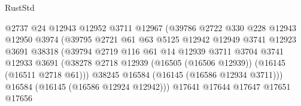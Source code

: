 \begin{lexlean}{RustStd}
\begin{coremodule}
                                        @2737
                                        @24
                                        @12943
                                        @12952
                                        @3711
                                        @12967
                                        (@39786
                                          @2722
                                          @330
                                          @228
                                          @12943
                                          @12950
                                          @3974
                                          (@39795
                                            @2721
                                            @61
                                            @63
                                            @5125
                                            @12942
                                            @12949
                                            @3741
                                            @12923
                                            @3691
                                            @38318
                                            (@39794
                                              @2719
                                              @116
                                              @61
                                              @14
                                              @12939
                                              @3711
                                              @3704
                                              @3741
                                              @12933
                                              @3691
                                              (@38278
                                                @2718
                                                @12939
                                                (@16505 (@16506 @12939))
                                                (@16145 (@16511 @2718 @61)))
                                              @38245
                                              @16584
                                              (@16145 (@16586 @12934 @3711)))
                                            @16584
                                            (@16145 (@16586 @12924 @12942)))
                                          @17641
                                          @17644
                                          @17647
                                          @17651
                                          @17656

\end{coremodule}
\end{lexlean}
